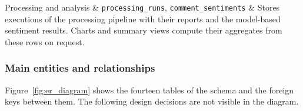 \begin{table}[H]
\begin{tabularx}
        \midrule
        Processing and analysis     & \texttt{processing\_runs}, \texttt{comment\_sentiments}                                                                                                                                                                                                               & Stores executions of the processing pipeline with their reports and the model-based sentiment results. Charts and summary views compute their aggregates from these rows on request.                                                                         \\
        \bottomrule
    \end{tabularx}
\end{table}

\subsubsection{Main entities and relationships}

Figure~\ref{fig:er_diagram} shows the fourteen tables of the schema and the foreign keys between them. The following design decisions are not visible in the diagram.

